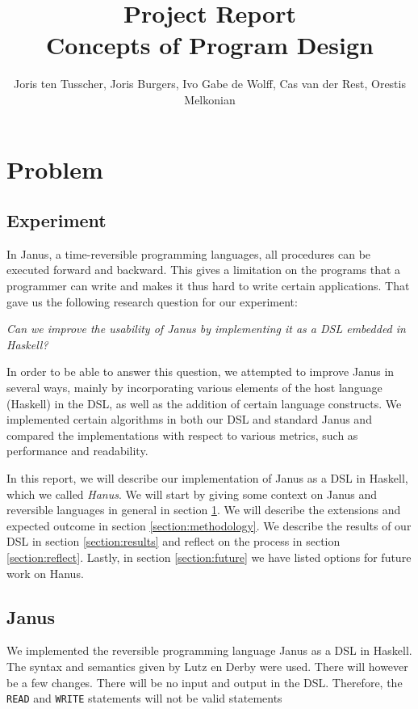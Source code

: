 \documentclass[12pt,a4paper]{article}
\title{\textbf{Project Report \\ \small{Concepts of Program Design}}}
\author{\small{Joris ten Tusscher, Joris Burgers, Ivo Gabe de Wolff, Cas van der Rest, Orestis Melkonian}}
\date{}
\begin{document}
\maketitle


\section{Problem}
\label{section:problem}
    \subsection{Experiment}
In Janus, a time-reversible programming languages, all procedures can be executed forward and backward. This gives a limitation on the programs that a programmer can write and makes it thus hard to write certain applications. That gave us the following research question for our experiment:

\begin{displayquote}
	\textit{Can we improve the usability of Janus by implementing it as a DSL embedded in Haskell?}
\end{displayquote}

\noindent In order to be able to answer this question, we attempted to improve Janus in several ways, mainly by incorporating various elements of the host language (Haskell) in the DSL, as well as the addition of certain language constructs. We implemented certain algorithms in both our DSL and standard Janus and compared the implementations with respect to various metrics, such as performance and readability. 

In this report, we will describe our implementation of Janus as a DSL in Haskell, which we called \textit{Hanus}. We will start by giving some context on Janus and reversible languages in general in section \ref{section:problem}. We will describe the extensions and expected outcome in section \ref{section:methodology}. We describe the results of our DSL in section \ref{section:results} and reflect on the process in section \ref{section:reflect}. Lastly, in section \ref{section:future} we have listed options for future work on Hanus.

\subsection{Janus}
We implemented the reversible programming language Janus as a DSL in Haskell. The syntax and semantics given by Lutz en Derby \cite{lutz82} were used. There will however be a few changes. There will be no input and output in the DSL. Therefore, the \texttt{READ} and \texttt{WRITE} statements will not be valid statements
\end{document}
